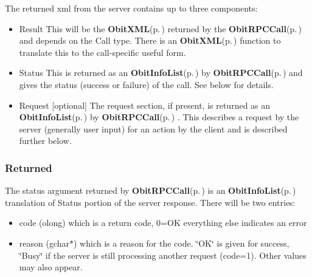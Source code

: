 The returned xml from the server contains up to three components: \begin{itemize}
\item Result This will be the {\bf Obit\-XML}{\rm (p.\,\pageref{structObitXML})} returned by the {\bf Obit\-RPCCall}{\rm (p.\,\pageref{ObitRPC_8c_a11})} and depends on the Call type. There is an {\bf Obit\-XML}{\rm (p.\,\pageref{structObitXML})} function to translate this to the call-specific useful form. \item Status This is returned as an {\bf Obit\-Info\-List}{\rm (p.\,\pageref{structObitInfoList})} by {\bf Obit\-RPCCall}{\rm (p.\,\pageref{ObitRPC_8c_a11})} and gives the status (success or failure) of the call. See below for details. \item Request [optional] The request section, if present, is returned as an {\bf Obit\-Info\-List}{\rm (p.\,\pageref{structObitInfoList})} by {\bf Obit\-RPCCall}{\rm (p.\,\pageref{ObitRPC_8c_a11})} . This describes a request by the server (generally user input) for an action by the client and is described further below.\end{itemize}
\subsubsection{Returned}\label{ObitDisplay_8h_Status}
The status argument returned by {\bf Obit\-RPCCall}{\rm (p.\,\pageref{ObitRPC_8c_a11})} is an {\bf Obit\-Info\-List}{\rm (p.\,\pageref{structObitInfoList})} translation of Status portion of the server response. There will be two entries: \begin{itemize}
\item code (olong) which is a return code, 0=OK everything else indicates an error \item reason (gchar$\ast$) which is a reason for the code. \char`\"{}OK\char`\"{} is given for success, \char`\"{}Busy\char`\"{} if the server is still processing another request (code=1). Other values may also appear.\end{itemize}
